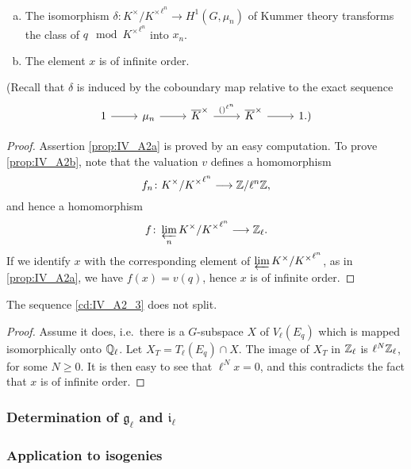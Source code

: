 \begin{subappendices}
\begin{prop}
\begin{enumerate}[(a)]
	\item\label{prop:IV_A2a}
		The isomorphism $\delta \colon K^\times/{K^\times}^{\ell^n} \to
		H^1(G, \mu_n)$ of Kummer theory transforms the class of $q
		\mod{ {K^\times}^{\ell^n} }$ into $x_n$.
	\item\label{prop:IV_A2b}
		The element $x$ is of infinite order.
\end{enumerate}
\end{prop}
(Recall that $\delta$ is induced by the coboundary map relative to
the exact sequence
\[\begin{tikzcd}
	1 \rar & \mu_n \rar & {\algcl K}^\times \rar["()^{\ell^n}"] &
	{\algcl K}^\times \rar & 1.)
\end{tikzcd}\]
\begin{proof}
	Assertion \ref{prop:IV_A2a} is proved by an easy computation. To prove
	\ref{prop:IV_A2b}, note that the valuation $v$ defines a homomorphism
	\[
		f_n \colon K^\times/{K^\times}^{\ell^n} \longrightarrow \mathbb{Z}/\ell^n\mathbb{Z},
	\]
	and hence a homomorphism
	\[
		f   \colon \varprojlim_n K^\times/{K^\times}^{\ell^n} \longrightarrow \mathbb{Z}_\ell.
	\]
	If we identify $x$ with the corresponding element of $\varprojlim K^\times/{K^\times}^{\ell^n}$, as
	in \ref{prop:IV_A2a}, we have $f(x) = v(q)$, hence $x$ is of infinite order.
\end{proof}

\begin{corp}
	The sequence \eqref{cd:IV_A2_3} does not split.
\end{corp}
\begin{proof}
	Assume it does, i.e.\ there is a $G$-subspace $X$ of $V_\ell(E_q)$
	which is mapped isomorphically onto $\mathbb{Q}_\ell$. Let $X_T = T_\ell(E_q)
	\cap X$.  The image of $X_T$ in $\mathbb{Z}_\ell$ is $\ell^N\mathbb{Z}_\ell$, for some
	$N \ge 0$. It is then easy to see that $\ell^N x = 0$, and this
	contradicts the fact that $x$ is of
	\dpage
	infinite order.
\end{proof}

\subsubsection{Determination of \texorpdfstring{$\mathfrak{g}_\ell$}{gℓ} and
\texorpdfstring{$\mathfrak{i}_\ell$}{iℓ}}
\label{sec:IV_A13}

\subsubsection{Application to isogenies}
\label{sec:IV_A14}


\end{subappendices}
